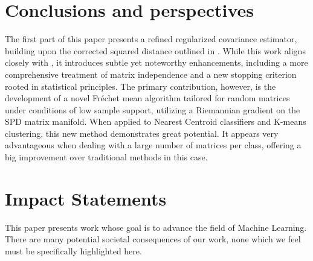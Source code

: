 \documentclass{article}
\theoremstyle{plain}
\theoremstyle{definition}
\theoremstyle{remark}
\begin{document}
\section{Conclusions and perspectives}
\label{sec:conclusion}


The first part of this paper presents a refined regularized covariance estimator, building upon the corrected squared distance outlined in \cite{couillet2019random}. While this work aligns closely with \cite{tiomoko2019random}, it introduces subtle yet noteworthy enhancements, including a more comprehensive treatment of matrix independence and a new stopping criterion rooted in statistical principles. The primary contribution, however, is the development of a novel Fréchet mean algorithm tailored for random matrices under conditions of low sample support, utilizing a Riemannian gradient on the SPD matrix manifold. When applied to Nearest Centroid classifiers and K-means clustering, this new method demonstrates great potential. It appears very advantageous when dealing with a large number of matrices per class, offering a big improvement over traditional methods in this case.

\section*{Impact Statements}

This paper presents work whose goal is to advance the field of Machine Learning. There are many potential societal consequences of our work, none which we feel must be specifically highlighted here.




\newpage
\appendix
\onecolumn





\end{document}
